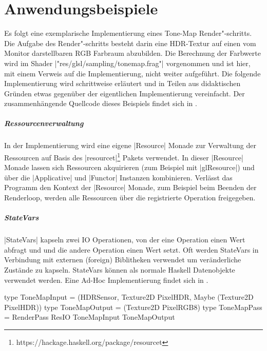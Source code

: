 \chapter{Anwendungsbeispiele}
\label{chap:anwendung}

Es folgt eine exemplarische Implementierung eines Tone-Map Render"-schritts. Die Aufgabe des Render"-schritts besteht darin eine HDR-Textur auf einen vom Monitor darstellbaren RGB Farbraum abzubilden. Die Berechnung der Farbwerte wird im Shader |"res/glsl/sampling/tonemap.frag"| vorgenommen und ist hier, mit einem Verweis auf die Implementierung, nicht weiter aufgeführt. Die folgende Implementierung wird schrittweise erläutert und in Teilen aus didaktischen Gründen etwas gegenüber der eigentlichen Implementierung vereinfacht. Der zusammenhängende Quellcode dieses Beispiels findet sich in .

\paragraph{Ressourcenverwaltung} In der Implementierung wird eine eigene |Resource| Monade zur Verwaltung der Ressourcen auf Basis des |resourcet|\footnote{https://hackage.haskell.org/package/resourcet} Pakets verwendet. In dieser |Resource| Monade lassen sich Ressourcen akquirieren (zum Beispiel mit |glResource|) und über die |Applicative| und |Functor| Instanzen kombinieren. Verlässt das Programm den Kontext der |Resource| Monade, zum Beispiel beim Beenden der Renderloop, werden alle Ressourcen über die registrierte Operation freigegeben.

\paragraph{StateVars} |StateVars| kapseln zwei IO Operationen, von der eine Operation einen Wert abfragt und und die andere Operation einen Wert setzt. Oft werden StateVars in Verbindung mit externen (foreign) Biblitheken verwendet um veränderliche Zustände zu kapseln. StateVars können als normale Haskell Datenobjekte verwendet werden. Eine Ad-Hoc Implementierung findet sich in .

\newpage

\begin{haskell}[label={lst:tonemap-pass-sig},caption={\texttt{ToneMapPass} Signatur},nolol]
type ToneMapInput = (HDRSensor, Texture2D PixelHDR, Maybe (Texture2D PixelHDR))
type ToneMapOutput = (Texture2D PixelRGB8)
type ToneMapPass = RenderPass ResIO ToneMapInput ToneMapOutput
\end{haskell}

